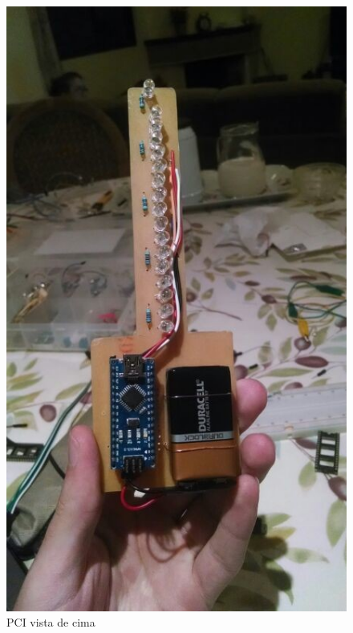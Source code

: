 \begin{figure}[!h]
	\centering
	\includegraphics{./PCI_cima.jpg}
	\caption[PCI vista de cima]{PCI vista de cima}
	\label{fig:pci_cima}
\end{figure}

